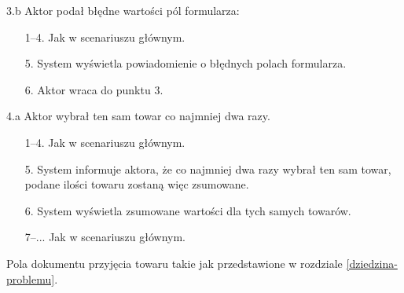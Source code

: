 \begin{usecase}
{\begin{enumerate}
      \end{enumerate}
    \item [3.b] Aktor podał błędne wartości pól formularza:
      \begin{enumerate}
        \item[1--4.] Jak w scenariuszu głównym.
        \item[5.] System wyświetla powiadomienie o błędnych polach formularza.
        \item[6.] Aktor wraca do punktu 3.
      \end{enumerate}
     \item[4.a] Aktor wybrał ten sam towar co najmniej dwa razy.
       \begin{enumerate}
       \item[1--4.] Jak w scenariuszu głównym.
       \item[5.] System informuje aktora, że co najmniej dwa razy wybrał ten sam towar, podane ilości towaru zostaną więc zsumowane.
       \item[6.] System wyświetla zsumowane wartości dla tych samych towarów.
       \item[7--...] Jak w scenariuszu głównym.
       \end{enumerate}
  }
   {
    Pola dokumentu przyjęcia towaru takie jak przedstawione w rozdziale \ref{dziedzina-problemu}.
  }
\end{usecase}

